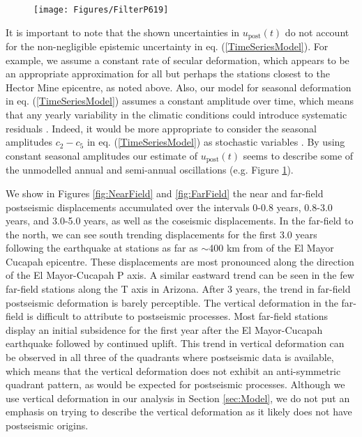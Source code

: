 \documentclass[review]{elsarticle}
\begin{document}
\begin{figure}
\texttt{[image: Figures/FilterP619]}
\centering
\caption{} 
\label{fig:P619}
\end{figure}

It is important to note that the shown uncertainties in $u_\mathrm{post}(t)$ do not account for the non-negligible epistemic uncertainty in eq. (\ref{TimeSeriesModel}).  For example, we assume a constant rate of secular deformation, which appears to be an appropriate approximation for all but perhaps the stations closest to the Hector Mine epicentre, as noted above.  Also, our model for seasonal deformation in eq. (\ref{TimeSeriesModel}) assumes a constant amplitude over time, which means that any yearly variability in the climatic conditions could introduce systematic residuals \citep{Davis2012}. Indeed, it would be more appropriate to consider the seasonal amplitudes $c_2-c_5$ in eq. (\ref{TimeSeriesModel}) as stochastic variables \citep{Murray2005}. By using constant seasonal amplitudes our estimate of $u_\mathrm{post}(t)$ seems to describe some of the unmodelled annual and semi-annual oscillations (e.g. Figure \ref{fig:P619}).          

We show in Figures \ref{fig:NearField} and \ref{fig:FarField} the near and far-field postseismic displacements accumulated over the intervals  0-0.8 years, 0.8-3.0 years, and 3.0-5.0 years, as well as the coseismic displacements.  In the far-field to the north, we can see south trending displacements for the first 3.0 years following the earthquake at stations as far as $\sim$400 km from of the El Mayor Cucapah epicentre.  These displacements are most pronounced along the direction of the El Mayor-Cucapah P axis. A similar eastward trend can be seen in the few far-field stations along the T axis in Arizona.  After 3 years, the trend in far-field postseismic deformation is barely perceptible.  The vertical deformation in the far-field is difficult to attribute to postseismic processes.  Most far-field stations display an initial subsidence for the first year after the El Mayor-Cucapah earthquake followed by continued uplift.  This trend in vertical deformation can be observed in all three of the quadrants where postseismic data is available, which means that the vertical deformation does not exhibit an anti-symmetric quadrant pattern, as would be expected for postseismic processes.  Although we use vertical deformation in our analysis in Section \ref{sec:Model},  we do not put an emphasis on trying to describe the vertical deformation as it likely does not have postseismic origins.        
\end{document}
